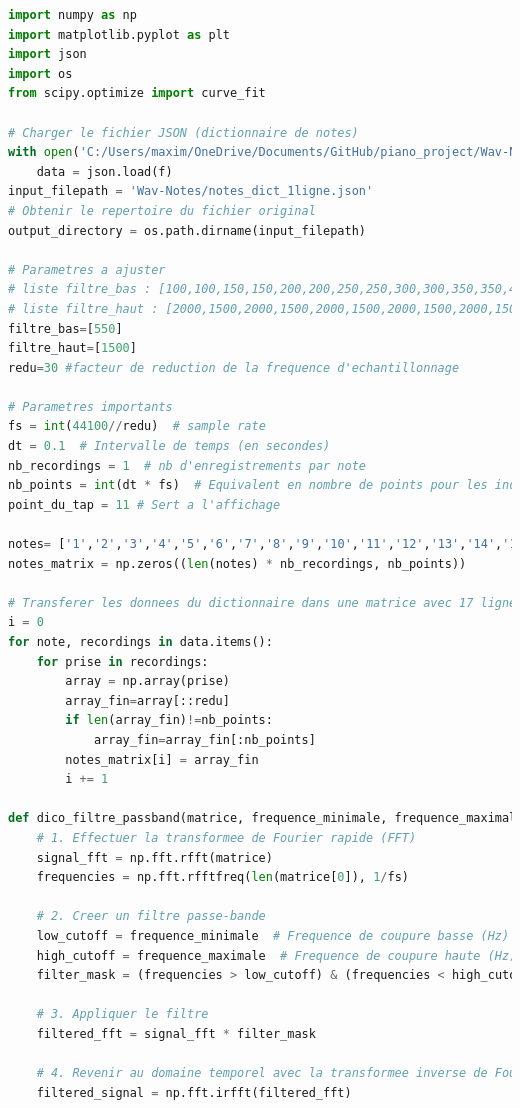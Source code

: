 ﻿\documentclass[11pt,letterpaper]{article}
\begin{document}
\begin{lstlisting}[language=python]
import numpy as np
import matplotlib.pyplot as plt
import json
import os
from scipy.optimize import curve_fit

# Charger le fichier JSON (dictionnaire de notes)
with open('C:/Users/maxim/OneDrive/Documents/GitHub/piano_project/Wav-Notes/notes_dict_1ligne.json', 'r') as f:
    data = json.load(f)
input_filepath = 'Wav-Notes/notes_dict_1ligne.json'
# Obtenir le repertoire du fichier original
output_directory = os.path.dirname(input_filepath)

# Parametres a ajuster
# liste filtre_bas : [100,100,150,150,200,200,250,250,300,300,350,350,400,400,500,500]
# liste filtre_haut : [2000,1500,2000,1500,2000,1500,2000,1500,2000,1500,2000,1500,2000,1500,2000,1500]
filtre_bas=[550]
filtre_haut=[1500]
redu=30 #facteur de reduction de la frequence d'echantillonnage

# Parametres importants
fs = int(44100//redu)  # sample rate
dt = 0.1  # Intervalle de temps (en secondes)
nb_recordings = 1  # nb d'enregistrements par note
nb_points = int(dt * fs)  # Equivalent en nombre de points pour les indices
point_du_tap = 11 # Sert a l'affichage

notes= ['1','2','3','4','5','6','7','8','9','10','11','12','13','14','15','16','17']
notes_matrix = np.zeros((len(notes) * nb_recordings, nb_points))

# Transferer les donnees du dictionnaire dans une matrice avec 17 lignes et nb_points par ligne
i = 0
for note, recordings in data.items():
    for prise in recordings:
        array = np.array(prise)
        array_fin=array[::redu]
        if len(array_fin)!=nb_points:
            array_fin=array_fin[:nb_points]
        notes_matrix[i] = array_fin
        i += 1

def dico_filtre_passband(matrice, frequence_minimale, frequence_maximale):
    # 1. Effectuer la transformee de Fourier rapide (FFT)
    signal_fft = np.fft.rfft(matrice)
    frequencies = np.fft.rfftfreq(len(matrice[0]), 1/fs)

    # 2. Creer un filtre passe-bande
    low_cutoff = frequence_minimale  # Frequence de coupure basse (Hz)
    high_cutoff = frequence_maximale  # Frequence de coupure haute (Hz)
    filter_mask = (frequencies > low_cutoff) & (frequencies < high_cutoff)

    # 3. Appliquer le filtre
    filtered_fft = signal_fft * filter_mask

    # 4. Revenir au domaine temporel avec la transformee inverse de Fourier
    filtered_signal = np.fft.irfft(filtered_fft)
    

\end{lstlisting}
\end{document}

